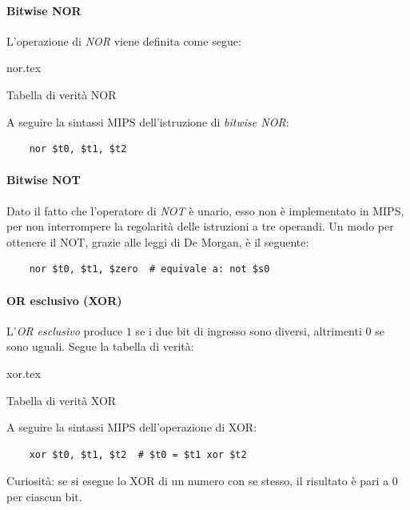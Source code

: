 \documentclass[class=book, crop=false]{standalone}
\begin{document}
\paragraph{Bitwise NOR}
L'operazione di \emph{NOR} viene definita come segue:
\begin{table}[H]
	\centering
	{nor.tex}
	\caption{Tabella di verità NOR}
\end{table}

A seguire la sintassi MIPS dell'istruzione di \emph{bitwise NOR}:
\begin{verbatim}
	nor $t0, $t1, $t2
\end{verbatim}

\paragraph{Bitwise NOT}
Dato il fatto che l'operatore di \emph{NOT} è unario, esso non è implementato in MIPS, per non interrompere la regolarità delle istruzioni a tre operandi. Un modo per ottenere il NOT, grazie alle leggi di De Morgan, è il seguente:
\begin{verbatim}
	nor $t0, $t1, $zero  # equivale a: not $s0
\end{verbatim}

\paragraph{OR esclusivo (XOR)}
L'\emph{OR esclusivo} produce \(1\) se i due bit di ingresso sono diversi, altrimenti \(0\) se sono uguali. Segue la tabella di verità:
\begin{table}[H]
	\centering
	{xor.tex}
	\caption{Tabella di verità XOR}
\end{table}

A seguire la sintassi MIPS dell'operazione di XOR:
\begin{verbatim}
	xor $t0, $t1, $t2  # $t0 = $t1 xor $t2
\end{verbatim}

Curiosità: se si esegue lo XOR di un numero con se stesso, il risultato è pari a \(0\) per ciascun bit.
\end{document}
